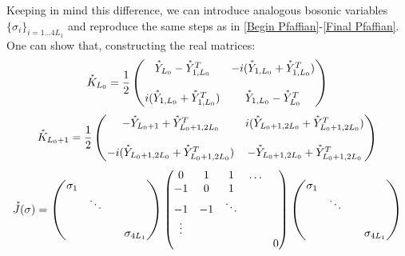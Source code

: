 Keeping in mind this difference, we can introduce analogous bosonic variables $\{\sigma_i\}_{i = 1\dots 4L_1}$ and reproduce the same steps as in \eqref{Begin Pfaffian}-\eqref{Final Pfaffian}. 
One can show that, constructing the real matrices:
\begin{equation}\label{Initial SA SB}
   \accentset{\ast}{K}_{L_0} = \frac{1}{2}\begin{pmatrix}
        \accentset{\ast}{Y}_{L_0} - \accentset{\ast}{Y}_{1, L_0}^T & -i (\accentset{\ast}{Y}_{1, L_0} + \accentset{\ast}{Y}_{1, L_0}^T) \\
        \\
        i(\accentset{\ast}{Y}_{1, L_0} + \accentset{\ast}{Y}_{1, L_0}^T) & \accentset{\ast}{Y}_{1, L_0} - \accentset{\ast}{Y}_{L_0}^T \\
    \end{pmatrix}
\end{equation}
\begin{equation}
   \accentset{\ast}K_{L_0 + 1} = \frac{1}{2}\begin{pmatrix}
        -\accentset{\ast}{Y}_{L_0 + 1} + \accentset{\ast}{Y}_{L_0 + 1, 2L_0}^T & i (\accentset{\ast}{Y}_{L_0 + 1, 2L_0} + \accentset{\ast}{Y}_{L_0 + 1, 2L_0}^T) \\
        \\
        -i(\accentset{\ast}{Y}_{L_0 + 1, 2L_0} + \accentset{\ast}{Y}_{L_0 + 1, 2L_0}^T) & - \accentset{\ast}{Y}_{L_0 + 1, 2L_0} + \accentset{\ast}{Y}_{L_0 + 1, 2L_0}^T \\
    \end{pmatrix}
\end{equation}
\begin{equation}
    \accentset{\ast}{J}(\sigma) = \begin{pmatrix}
        \sigma_1 & \\
        & \ddots & \\
        \\
        & & & \sigma_{4L_1} \\
    \end{pmatrix}\begin{pmatrix}
        0 & 1 & 1 & \dots \\
        -1 & 0 & 1  \\
        -1 & - 1 & \ddots & \\
        \vdots & \\
        & & & & 0 \\
    \end{pmatrix}
    \begin{pmatrix}
        \sigma_1 & \\
        & \ddots & \\
        \\
        & & & \sigma_{4L_1} \\
    \end{pmatrix}
\end{equation}
